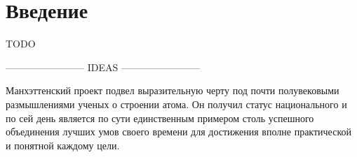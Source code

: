 \chapter*{Введение}

TODO

------------------------ IDEAS ------------------------ 

Манхэттенский проект подвел выразительную черту под почти полувековыми размышлениями ученых о строении атома.
Он получил статус национального и по сей день является по сути единственным примером столь успешного объединения лучших умов своего времени для достижения вполне практической и понятной каждому цели.

